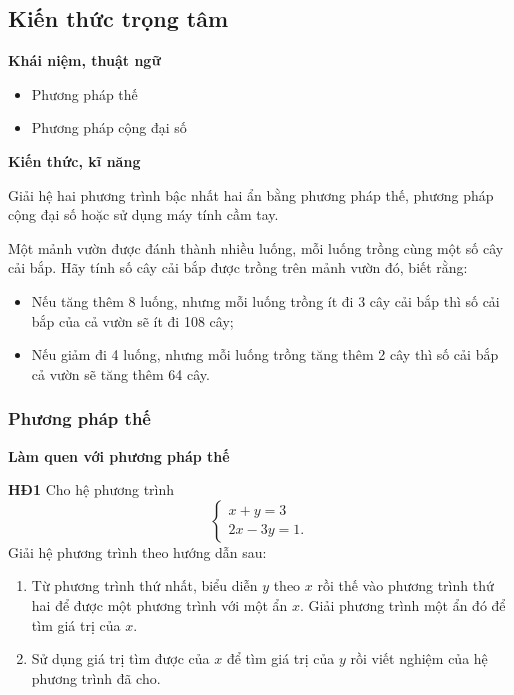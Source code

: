 \begin{lesson}
    \subsection{Kiến thức trọng tâm}

    \textbf{Khái niệm, thuật ngữ}
    \begin{itemize}
        \item Phương pháp thế
        \item Phương pháp cộng đại số
    \end{itemize}

    \textbf{Kiến thức, kĩ năng}

    Giải hệ hai phương trình bậc nhất hai ẩn bằng phương pháp thế, phương pháp cộng đại số hoặc sử dụng máy tính cầm tay.

    Một mảnh vườn được đánh thành nhiều luống, mỗi luống trồng cùng một số cây cải bắp. Hãy tính số cây cải bắp được trồng trên mảnh vườn đó, biết rằng:
    \begin{itemize}
        \item Nếu tăng thêm 8 luống, nhưng mỗi luống trồng ít đi 3 cây cải bắp thì số cải bắp của cả vườn sẽ ít đi 108 cây;
        \item Nếu giảm đi 4 luống, nhưng mỗi luống trồng tăng thêm 2 cây thì số cải bắp cả vườn sẽ tăng thêm 64 cây.
    \end{itemize}

    \subsubsection{Phương pháp thế}

    \textbf{Làm quen với phương pháp thế}

    \textbf{HĐ1} Cho hệ phương trình
    \[
        \begin{cases}
            x+y=3\\
            2x-3y=1.
        \end{cases}
    \]
    Giải hệ phương trình theo hướng dẫn sau:
    \begin{enumerate}
        \item Từ phương trình thứ nhất, biểu diễn $y$ theo $x$ rồi thế vào phương trình thứ hai để được một phương trình với một ẩn $x$. Giải phương trình một ẩn đó để tìm giá trị của $x$.
        \item Sử dụng giá trị tìm được của $x$ để tìm giá trị của $y$ rồi viết nghiệm của hệ phương trình đã cho.
    \end{enumerate}


\end{lesson}
